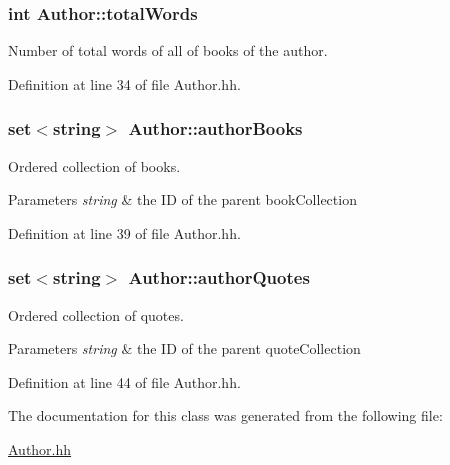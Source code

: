 \subsubsection[{\texorpdfstring{total\+Words}{totalWords}}]{\setlength{\rightskip}{0pt plus 5cm}int Author\+::total\+Words\hspace{0.3cm}{\ttfamily [private]}}\hypertarget{class_author_a478c72fff965eb1ee8fcaddfe173715b}{}\label{class_author_a478c72fff965eb1ee8fcaddfe173715b}


Number of total words of all of books of the author. 



Definition at line 34 of file Author.\+hh.

\subsubsection[{\texorpdfstring{author\+Books}{authorBooks}}]{\setlength{\rightskip}{0pt plus 5cm}set$<$string$>$ Author\+::author\+Books\hspace{0.3cm}{\ttfamily [private]}}\hypertarget{class_author_ad9ffe450cdafed2242936f6fcafa22b4}{}\label{class_author_ad9ffe450cdafed2242936f6fcafa22b4}


Ordered collection of books. 


\begin{DoxyParams}{Parameters}
{\em string} & the ID of the parent book\+Collection \\
\hline
\end{DoxyParams}


Definition at line 39 of file Author.\+hh.

\subsubsection[{\texorpdfstring{author\+Quotes}{authorQuotes}}]{\setlength{\rightskip}{0pt plus 5cm}set$<$string$>$ Author\+::author\+Quotes\hspace{0.3cm}{\ttfamily [private]}}\hypertarget{class_author_ad505d991f439d28c4831828952e01fb6}{}\label{class_author_ad505d991f439d28c4831828952e01fb6}


Ordered collection of quotes. 


\begin{DoxyParams}{Parameters}
{\em string} & the ID of the parent quote\+Collection \\
\hline
\end{DoxyParams}


Definition at line 44 of file Author.\+hh.



The documentation for this class was generated from the following file\+:\begin{DoxyCompactItemize}
\item 
\hyperlink{_author_8hh}{Author.\+hh}\end{DoxyCompactItemize}
